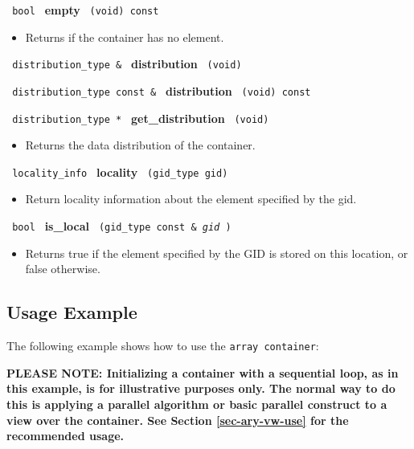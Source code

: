 \noindent
\texttt{%
bool
}
\textbf{empty}%
\texttt{%
(void) const
}

\begin{itemize}
\item
Returns if the container has no element.
\end{itemize}
 
\noindent
\texttt{%
distribution\_type \& 
}
\textbf{distribution}%
\texttt{%
 (void)
}
 
\noindent
\texttt{%
distribution\_type const \& 
}
\textbf{distribution}%
\texttt{%
 (void) const
}
 
\noindent
\texttt{%
distribution\_type *
}
\textbf{get\_distribution}%
\texttt{%
(void)
}
 
\begin{itemize}
\item
Returns the data distribution of the container.
\end{itemize}

\noindent
\texttt{%
locality\_info 
}
\textbf{locality}%
\texttt{%
 (gid\_type gid)
}

\begin{itemize}
\item
Return locality information about the element specified by the gid. 
\end{itemize}
 
\noindent
\texttt{%
bool
}
\textbf{is\_local}%
\texttt{%
(gid\_type const \&
\textit{gid}%
)
}

\begin{itemize}
\item
Returns true if the element specified by the GID is stored on this location, or false otherwise. 
\end{itemize}

\subsection{Usage Example} \label{sec-ary-cont-use}

The following example shows how to use the \texttt{array container}:


\textbf{PLEASE NOTE: 
Initializing a container with a sequential loop, as in this example,
is for illustrative purposes only.
The normal way to do this is applying a parallel algorithm or 
basic parallel construct to a view over the container.  See Section
\ref{sec-ary-vw-use}
for the recommended usage.
}

